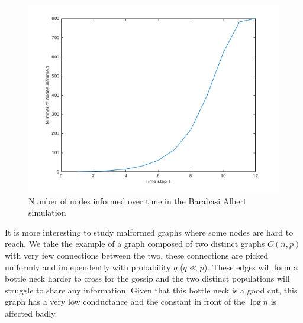 \documentclass[10pt,journal,a4paper]{IEEEtran}
\begin{document}
\begin{figure}[h]
\centering
\includegraphics[width=1\linewidth]{figs/barabasi-albert-chart}
\caption{Number of nodes informed over time in the Barabasi Albert simulation}
\label{fig:barabasi-albert-chart}
\end{figure}

It is more interesting to study malformed graphs where some nodes are hard to reach. We take the example of a graph composed of two distinct graphs $C(n,p)$ with very few connections between the two, these connections are picked  uniformly and independently with probability $q$ ($q \ll p$). These edges will form a bottle neck harder to cross for the gossip and the two distinct populations will struggle to share any information. Given that this bottle neck is a good cut, this graph has a very low conductance and the constant in front of the $\log n$ is affected badly. 
\end{document}
